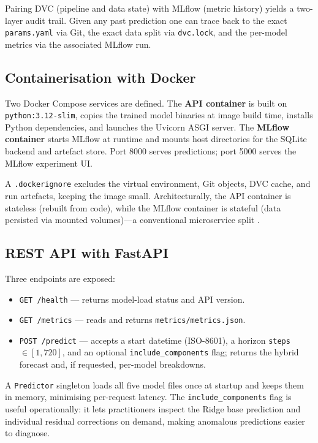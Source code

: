 \documentclass[conference]{IEEEtran}
\begin{document}
  Pairing DVC (pipeline and data state) with MLflow (metric history) yields a
  two-layer audit trail. Given any past prediction one can trace back to the exact
  \texttt{params.yaml} via Git, the exact data split via \texttt{dvc.lock}, and the
  per-model metrics via the associated MLflow run.

  \subsection{Containerisation with Docker}

  Two Docker Compose services are defined. The \textbf{API container} is built on
  \texttt{python:3.12-slim}, copies the trained model binaries at image build time,
  installs Python dependencies, and launches the Uvicorn ASGI server. The
  \textbf{MLflow container} starts MLflow at runtime and mounts host directories
  for the SQLite backend and artefact store. Port 8000 serves predictions; port 5000
  serves the MLflow experiment UI.

  A \texttt{.dockerignore} excludes the virtual environment, Git objects, DVC cache,
  and run artefacts, keeping the image small. Architecturally, the API container is
  stateless (rebuilt from code), while the MLflow container is stateful (data
  persisted via mounted volumes)---a conventional microservice split \cite{docker2013}.

  \subsection{REST API with FastAPI}

  Three endpoints are exposed:
  \begin{itemize}
    \item \texttt{GET /health} --- returns model-load status and API version.

    \item \texttt{GET /metrics} --- reads and returns \texttt{metrics/metrics.json}.

    \item \texttt{POST /predict} --- accepts a start datetime (ISO-8601), a horizon
      \texttt{steps} $\in [1, 720]$, and an optional \texttt{include\_components}
      flag; returns the hybrid forecast and, if requested, per-model breakdowns.
  \end{itemize}

  A \texttt{Predictor} singleton loads all five model files once at startup and keeps
  them in memory, minimising per-request latency. The \texttt{include\_components}
  flag is useful operationally: it lets practitioners inspect the Ridge base
  prediction and individual residual corrections on demand, making anomalous
  predictions easier to diagnose.
\end{document}
